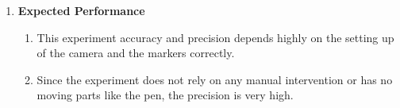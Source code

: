 \documentclass[10pt,a4paper]{article}
\begin{document}
\begin{enumerate}[label=\Roman*]
\begin{enumerate}[label=\roman*)]
\begin{enumerate}
\item
\textbf{Expected Performance}\\
\begin{enumerate}
	\item
	This experiment accuracy and precision depends highly on the setting up of the camera and the markers correctly.
	\item
	Since the experiment does not rely on any manual intervention or has no moving parts like the pen, the precision is very high.
\end{enumerate}
\end{enumerate}
\vspace{0.5cm}


\end{enumerate}


	

\end{enumerate}	
\end{document}
